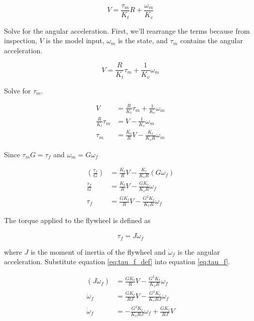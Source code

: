 \begin{equation*}
  V = \frac{\tau_m}{K_t} R + \frac{\omega_m}{K_v}
\end{equation*}

Solve for the angular acceleration. First, we'll rearrange the terms because
from inspection, $V$ is the \gls{model} \gls{input}, $\omega_m$ is the
\gls{state}, and $\tau_m$ contains the angular acceleration.

\begin{equation*}
  V = \frac{R}{K_t} \tau_m + \frac{1}{K_v} \omega_m
\end{equation*}

Solve for $\tau_m$.

\begin{align*}
  V &= \frac{R}{K_t} \tau_m + \frac{1}{K_v} \omega_m \\
  \frac{R}{K_t} \tau_m &= V - \frac{1}{K_v} \omega_m \\
  \tau_m &= \frac{K_t}{R} V - \frac{K_t}{K_v R} \omega_m
\end{align*}

Since $\tau_m G = \tau_f$ and $\omega_m = G \omega_f$

\begin{align}
  \left(\frac{\tau_f}{G}\right) &= \frac{K_t}{R} V -
    \frac{K_t}{K_v R} (G \omega_f) \nonumber \\
  \frac{\tau_f}{G} &= \frac{K_t}{R} V - \frac{G K_t}{K_v R} \omega_f \nonumber
    \\
  \tau_f &= \frac{G K_t}{R} V - \frac{G^2 K_t}{K_v R} \omega_f \label{eq:tau_f}
\end{align}

The torque applied to the flywheel is defined as

\begin{equation}
  \tau_f = J \dot{\omega}_f \label{eq:tau_f_def}
\end{equation}

where $J$ is the moment of inertia of the flywheel and $\dot{\omega}_f$ is the
angular acceleration. Substitute equation \eqref{eq:tau_f_def} into equation
\eqref{eq:tau_f}.

\begin{align*}
  (J \dot{\omega}_f) &= \frac{G K_t}{R} V - \frac{G^2 K_t}{K_v R} \omega_f \\
  \dot{\omega}_f &= \frac{G K_t}{RJ} V - \frac{G^2 K_t}{K_v RJ} \omega_f \\
  \dot{\omega}_f &= -\frac{G^2 K_t}{K_v RJ} \omega_f + \frac{G K_t}{RJ} V
\end{align*}

